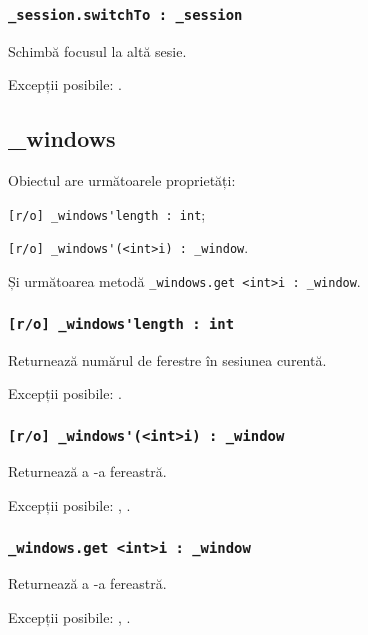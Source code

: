 \subsubsection{\lstinline|_session.switchTo : _session|}

Schimbă focusul la altă sesie.

Excepții posibile: .


\subsection{{\color{orange} \_windows}}

Obiectul \windows{} are următoarele proprietăți:
\begin{icItems}
	\item \lstinline|[r/o] _windows'length : int|;
	\item \lstinline|[r/o] _windows'(<int>i) : _window|.
\end{icItems}

Și următoarea metodă \lstinline|_windows.get <int>i : _window|.

\subsubsection{\lstinline|[r/o] _windows'length : int|}

Returnează numărul de ferestre în sesiunea curentă.

Excepții posibile: .

\subsubsection{\lstinline|[r/o] _windows'(<int>i) : _window|}

Returnează a -a fereastră.

Excepții posibile: , .

\subsubsection{\lstinline|_windows.get <int>i : _window|}

Returnează a -a fereastră.

Excepții posibile: , .

